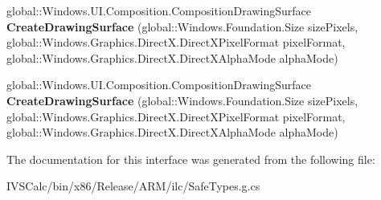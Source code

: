 \begin{DoxyCompactItemize}
\item 
\mbox{\label{interface_windows_1_1_u_i_1_1_composition_1_1_i_composition_graphics_device_ae97c7fbac0ad9b00790ef52577c30963}} 
global\+::\+Windows.\+U\+I.\+Composition.\+Composition\+Drawing\+Surface {\bfseries Create\+Drawing\+Surface} (global\+::\+Windows.\+Foundation.\+Size size\+Pixels, global\+::\+Windows.\+Graphics.\+Direct\+X.\+Direct\+X\+Pixel\+Format pixel\+Format, global\+::\+Windows.\+Graphics.\+Direct\+X.\+Direct\+X\+Alpha\+Mode alpha\+Mode)
\item 
\mbox{\label{interface_windows_1_1_u_i_1_1_composition_1_1_i_composition_graphics_device_ae97c7fbac0ad9b00790ef52577c30963}} 
global\+::\+Windows.\+U\+I.\+Composition.\+Composition\+Drawing\+Surface {\bfseries Create\+Drawing\+Surface} (global\+::\+Windows.\+Foundation.\+Size size\+Pixels, global\+::\+Windows.\+Graphics.\+Direct\+X.\+Direct\+X\+Pixel\+Format pixel\+Format, global\+::\+Windows.\+Graphics.\+Direct\+X.\+Direct\+X\+Alpha\+Mode alpha\+Mode)
\end{DoxyCompactItemize}


The documentation for this interface was generated from the following file\+:\begin{DoxyCompactItemize}
\item 
I\+V\+S\+Calc/bin/x86/\+Release/\+A\+R\+M/ilc/Safe\+Types.\+g.\+cs\end{DoxyCompactItemize}
